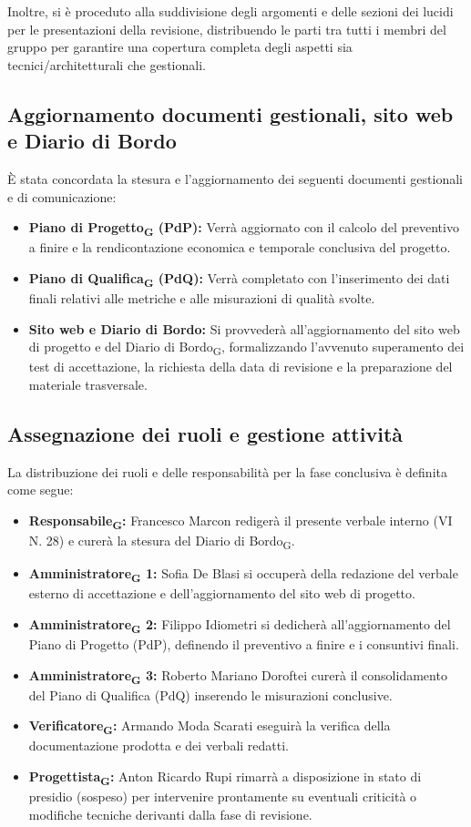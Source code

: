 Inoltre, si è proceduto alla suddivisione degli argomenti e delle sezioni dei lucidi per le presentazioni della revisione, distribuendo le parti tra tutti i membri del gruppo per garantire una copertura completa degli aspetti sia tecnici/architetturali che gestionali.

\subsection{Aggiornamento documenti gestionali, sito web e Diario di Bordo}
È stata concordata la stesura e l'aggiornamento dei seguenti documenti gestionali e di comunicazione:
\begin{itemize}
\item \textbf{Piano di Progetto\textsubscript{G} (PdP):} Verrà aggiornato con il calcolo del preventivo a finire e la rendicontazione economica e temporale conclusiva del progetto.
\item \textbf{Piano di Qualifica\textsubscript{G} (PdQ):} Verrà completato con l'inserimento dei dati finali relativi alle metriche e alle misurazioni di qualità svolte.
\item \textbf{Sito web e Diario di Bordo:} Si provvederà all'aggiornamento del sito web di progetto e del Diario di Bordo\textsubscript{G}, formalizzando l'avvenuto superamento dei test di accettazione, la richiesta della data di revisione e la preparazione del materiale trasversale.
\end{itemize}

\subsection{Assegnazione dei ruoli e gestione attività}
La distribuzione dei ruoli e delle responsabilità per la fase conclusiva è definita come segue:
\begin{itemize}
\item \textbf{Responsabile\textsubscript{G}:} Francesco Marcon redigerà il presente verbale interno (VI N. 28) e curerà la stesura del Diario di Bordo\textsubscript{G}.
\item \textbf{Amministratore\textsubscript{G} 1:} Sofia De Blasi si occuperà della redazione del verbale esterno di accettazione e dell'aggiornamento del sito web di progetto.
\item \textbf{Amministratore\textsubscript{G} 2:} Filippo Idiometri si dedicherà all'aggiornamento del Piano di Progetto (PdP), definendo il preventivo a finire e i consuntivi finali.
\item \textbf{Amministratore\textsubscript{G} 3:} Roberto Mariano Doroftei curerà il consolidamento del Piano di Qualifica (PdQ) inserendo le misurazioni conclusive.
\item \textbf{Verificatore\textsubscript{G}:} Armando Moda Scarati eseguirà la verifica della documentazione prodotta e dei verbali redatti.
\item \textbf{Progettista\textsubscript{G}:} Anton Ricardo Rupi rimarrà a disposizione in stato di presidio (sospeso) per intervenire prontamente su eventuali criticità o modifiche tecniche derivanti dalla fase di revisione.
\end{itemize}



